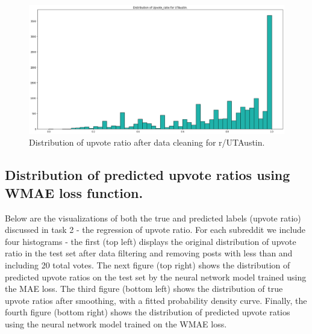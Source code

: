 \documentclass[11pt,a4paper]{article}
\let\Oldsubsection\subsection
\renewcommand{\subsection}{\FloatBarrier\Oldsubsection}
\begin{document}
    \begin{figure}
        \includegraphics[width=\textwidth]{utaustin_ratio1.png}
        \caption{Distribution of upvote ratio after data cleaning for r/UTAustin.}
    \end{figure}


    \subsection{Distribution of predicted upvote ratios using WMAE loss function.}
    \label{sec:appdistr}

    Below are the visualizations of both the true and predicted labels (upvote ratio) discussed in task 2 - the regression of upvote ratio. For each subreddit we include four histograms - the first (top left) displays the original distribution of upvote ratio in the test set after data filtering and removing posts with less than and including 20 total votes. The next figure (top right) shows the distribution of predicted upvote ratios on the test set by the neural network model trained using the MAE loss. The third figure (bottom left) shows the distribution of true upvote ratios after smoothing, with a fitted probability density curve. Finally, the fourth figure (bottom right) shows the distribution of predicted upvote ratios using the neural network model trained on the WMAE loss.
\end{document}
